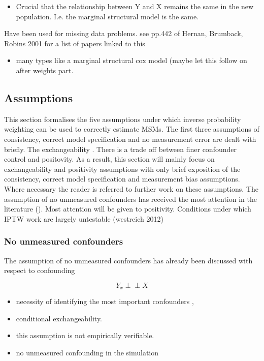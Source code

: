 \documentclass[11pt]{article}
\providecommand{\tightlist}{%
      \setlength{\itemsep}{0pt}\setlength{\parskip}{0pt}}
\begin{document}
\begin{itemize}
\tightlist
\item
  Crucial that the relationship between Y and X remains the same in the
  new population. I.e. the marginal structural model is the same.
\end{itemize}

Have been used for missing data problems. see pp.442 of Hernan,
Brumback, Robins 2001 for a list of papers linked to this

\begin{itemize}
\tightlist
\item
  many types like a marginal structural cox model (maybe let this follow
  on after weights part.
\end{itemize}

    \subsection{Assumptions}\label{assumptions}

This section formalises the five assumptions under which inverse
probability weighting can be used to correctly estimate MSMs. The first
three assumptions of consistency, correct model specification and no
measurement error are dealt with briefly. The exchangeability . There is
a trade off between finer confounder control and positovity. As a
result, this section will mainly focus on exchangeability and positivity
assumptions with only brief exposition of the consistency, correct model
specification and measurement bias assumptions. Where necessary the
reader is referred to further work on these assumptions. The assumption
of no unmeasured confounders has received the most attention in the
literature (). Most attention will be given to positivity. Conditions
under which IPTW work are largely untestable (westreich 2012)

\subsubsection{No unmeasured
confounders}\label{no-unmeasured-confounders}

The assumption of no unmeasured confounders has already been discussed
with respect to confounding

\[Y_{x} \perp\!\!\!\perp X\]

\begin{itemize}
\tightlist
\item
  necessity of identifying the most important confounders \citet{},
  \citet{}
\item
  conditional exchangeability.
\item
  this assumption is not empirically verifiable.
\item
  no unmeasured confounding in the simulation
\end{itemize}
\end{document}
